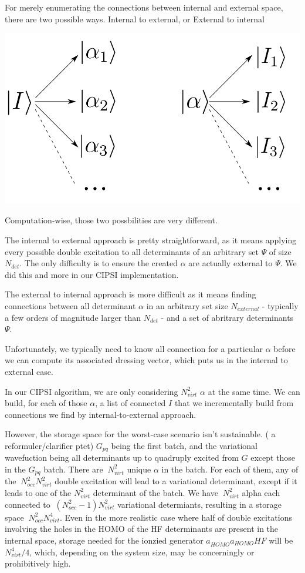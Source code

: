 \documentclass[./thesis.tex]{subfiles}
\begin{document}
For merely enumerating the connections between internal and external space, there are two possible ways.
Internal to external, or External to internal
	\begin{center}
		\includegraphics[width=0.5\columnwidth]{figures/matrix_dressing/interactions}
	\end{center}

Computation-wise, those two possbilities are very different.

The internal to external approach is pretty straightforward, as it means applying every possible double excitation to all determinants of an arbitrary set $\Psi$ of size $N_{det}$. The only difficulty is to ensure the created $\alpha$ are actually external to $\Psi$. We did this and more in our CIPSI implementation.

The external to internal approach is more difficult as it means finding connections between all determinant $\alpha$ in an arbitrary set size $N_{external}$ - typically a few orders of magnitude larger than $N_{det}$ - and a set of abritrary determinants $\Psi$. 

Unfortunately, we typically need to know all connection for a particular $\alpha$ before we can compute its associated dressing vector, which puts us in the internal to external case.

In our CIPSI algorithm, we are only considering $N_{virt}^2$ $\alpha$ at the same time. We can build, for each of those $\alpha$, a list of connected $I$ that we incrementally build from connections we find by internal-to-external approach.


However, the storage space for the worst-case scenario isn't sustainable. ( a reformuler/clarifier ptet)
$G_{pq}$ being the first batch, and the variational wavefuction being all determinants up to quadruply excited from $G$ except those in the $G_{pq}$ batch. There are $~ N_{virt}^2$ unique $\alpha$ in the batch. For each of them, any of the $~N_{occ}^2 N_{virt}^2$ double excitation will lead to a variational determinant, except if it leads to one of the $N_{virt}^2$ determinant of the batch.
We have $~ N_{virt}^2$ alpha each connected to $~(N_{occ}^2-1) N_{virt}^2$ variational determiants, resulting in a storage space $~N_{occ}^2 N_{virt}^4$.
Even in the more realistic case where half of double excitations involving the holes in the HOMO of the HF determinants are present in the internal space, storage needed for the ionzied generator $a_{\bar{HOMO}} a_{HOMO} HF$ will be $N_{virt}^4 / 4$, which, depending on the system size, may be concerningly or prohibitively high. 
\end{document}
